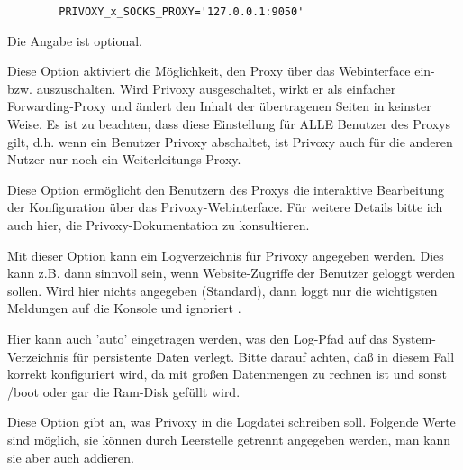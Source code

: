 \begin{description}
{\begin{example}
\begin{verbatim}
        PRIVOXY_x_SOCKS_PROXY='127.0.0.1:9050'
\end{verbatim}
\end{example}
        Die Angabe ist optional.}


        {Diese Option aktiviert die Möglichkeit, den Proxy über das
        Webinterface ein- bzw. auszuschalten. Wird Privoxy
        ausgeschaltet, wirkt er als einfacher Forwarding-Proxy und
        ändert den Inhalt der übertragenen Seiten in keinster
        Weise. Es ist zu beachten, dass diese Einstellung für ALLE
        Benutzer des Proxys gilt, d.h. wenn ein Benutzer Privoxy
        abschaltet, ist Privoxy auch für die anderen Nutzer nur noch
        ein Weiterleitungs-Proxy.}


        {Diese Option ermöglicht den Benutzern des Proxys die
        interaktive Bearbeitung der Konfiguration über das
        Privoxy-Webinterface. Für weitere Details bitte ich auch hier,
        die Privoxy-Dokumentation zu konsultieren.}


        {Mit dieser Option kann ein Logverzeichnis für Privoxy
        angegeben werden.  Dies kann z.B. dann sinnvoll sein, wenn
        Website-Zugriffe der Benutzer geloggt werden sollen. Wird hier
        nichts angegeben (Standard), dann loggt nur die wichtigsten
        Meldungen auf die Konsole und ignoriert
        .}

        Hier kann auch 'auto' eingetragen werden, was den Log-Pfad auf
        das System-Verzeichnis für persistente Daten verlegt.
        Bitte darauf achten, daß in diesem Fall  korrekt
        konfiguriert wird, da mit großen Datenmengen zu rechnen ist und sonst
        /boot oder gar die Ram-Disk gefüllt wird.


        {Diese Option gibt an, was Privoxy in die Logdatei schreiben
        soll. Folgende Werte sind möglich, sie können durch Leerstelle
        getrennt angegeben werden, man kann sie aber auch addieren.

}
\end{description}
